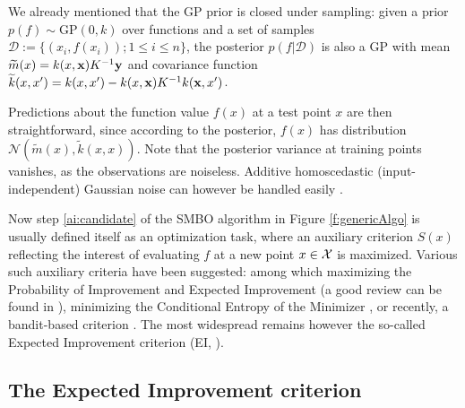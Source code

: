 \documentclass{article}
\newcommand{\vs}[1]{\vspace*{-#1mm}}
\newcommand{\Bss}{\vs{1}}
\newcommand{\ass}{\vs{0.7}}
\begin{document}
We already mentioned that the GP prior is closed under sampling:
given a prior $p(f) \sim \text{GP}(0,k)$ over functions and a set of samples
$\mathcal{D}:=\big\{(x_i,f(x_i)) ; 1\leq i\leq n\big\}$, the posterior
$p(f\vert\mathcal{D})$ is also a GP with mean $
\widetilde{m}(x) = k(x,{\bf x})K^{-1}{\bf y}$ and covariance function
$\widetilde{k}(x,x') = k(x,x')-k(x,{\bf x})K^{-1}k({\bf x},x')$.


Predictions about the function value $f(x)$ at a test point $x$
are then straightforward, since according to the posterior, $f(x)$
has distribution $\mathcal{N}(\widetilde{m}(x),\widetilde{k}(x,x)).$ Note that
the posterior variance at training points vanishes, as the
observations are noiseless. Additive homoscedastic (input-independent)
Gaussian noise can however be handled easily \cite{RaWi06}.

Now step \ref{ai:candidate} of the SMBO algorithm in Figure
\ref{f:genericAlgo} is usually defined itself as an optimization
task, where an auxiliary criterion $S(x)$ reflecting the interest of
evaluating $f$ at a new point $x\in{\cal X}$ is maximized. Various such
auxiliary criteria have been suggested: among which maximizing the
Probability of Improvement and Expected Improvement (a good review can
be found in \cite{Jon01}), minimizing the Conditional Entropy of the
Minimizer \cite{ViVaWa06}, or recently, a bandit-based criterion
\cite{SrKrKaSe10}. The most widespread remains however
the so-called Expected Improvement criterion (EI, \cite{Jon01}).

\Bss
\subsection{The Expected Improvement criterion}
\ass
\end{document}
